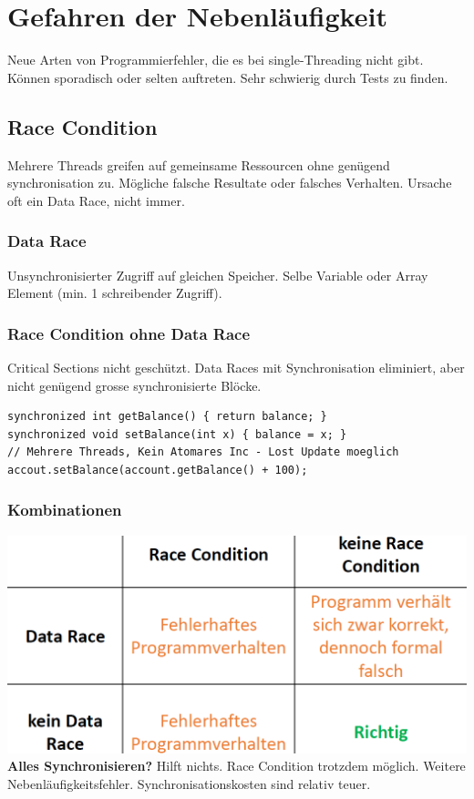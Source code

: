 \section{Gefahren der Nebenläufigkeit}
Neue Arten von Programmierfehler, die es bei single-Threading nicht gibt. 
Können sporadisch oder selten auftreten.
Sehr schwierig durch Tests zu finden.

\subsection{Race Condition}
Mehrere Threads greifen auf gemeinsame Ressourcen ohne genügend synchronisation zu.
Mögliche falsche Resultate oder falsches Verhalten.
Ursache oft ein Data Race, nicht immer.

\subsubsection{Data Race}
Unsynchronisierter Zugriff auf gleichen Speicher.
Selbe Variable oder Array Element (min. 1 schreibender Zugriff).

\subsubsection{Race Condition ohne Data Race}
Critical Sections nicht geschützt. 
Data Races mit Synchronisation eliminiert, aber nicht genügend grosse synchronisierte Blöcke.
\begin{lstlisting}
synchronized int getBalance() { return balance; }
synchronized void setBalance(int x) { balance = x; }
// Mehrere Threads, Kein Atomares Inc - Lost Update moeglich 
accout.setBalance(account.getBalance() + 100);
\end{lstlisting}

\subsubsection{Kombinationen}
\includegraphics[width=0.6\linewidth]{img/race_condition.png}\\ 
\textbf{Alles Synchronisieren?} Hilft nichts. Race Condition trotzdem möglich. Weitere Nebenläufigkeitsfehler.
Synchronisationskosten sind relativ teuer.

